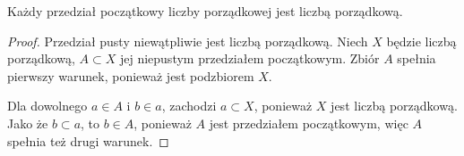 \begin{theorem}
    Każdy przedział początkowy liczby porządkowej jest liczbą porządkową.
\end{theorem}
\begin{proof}
    Przedział pusty niewątpliwie jest liczbą porządkową. Niech \( X \) będzie liczbą porządkową, \( A \subset X \) jej niepustym przedziałem początkowym.
    Zbiór \( A \) spełnia pierwszy warunek, ponieważ jest podzbiorem \( X \).

    Dla dowolnego \( a \in A \) i \( b \in a \), zachodzi \( a \subset X \), ponieważ \( X \) jest liczbą porządkową. Jako że \( b \subset a \), to \( b \in A \), ponieważ \( A \) jest przedziałem początkowym,
    więc \( A \) spełnia też drugi warunek.
\end{proof}